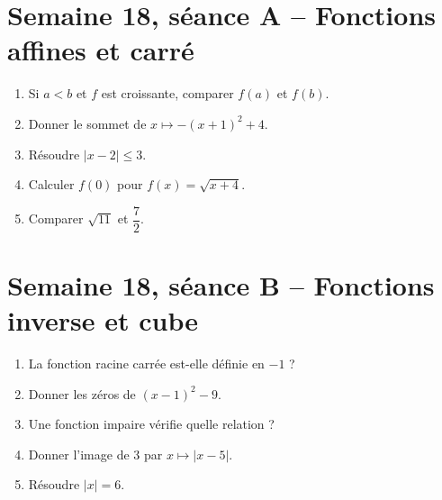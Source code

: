 \section{Semaine 18, séance A -- Fonctions affines et carré}
\begin{enumerate}
  \item Si $a<b$ et $f$ est croissante, comparer $f(a)$ et $f(b)$.
  \item Donner le sommet de $x\mapsto-(x+1)^2+4$.
  \item Résoudre $|x-2|\leq3$.
  \item Calculer $f(0)$ pour $f(x)=\sqrt{x+4}$.
  \item Comparer $\sqrt{11}$ et $\dfrac72$.
\end{enumerate}

\section{Semaine 18, séance B -- Fonctions inverse et cube}
\begin{enumerate}
  \item La fonction racine carrée est-elle définie en $-1$ ?
  \item Donner les zéros de $(x-1)^2-9$.
  \item Une fonction impaire vérifie quelle relation ?
  \item Donner l'image de $3$ par $x\mapsto|x-5|$.
  \item Résoudre $|x|=6$.
\end{enumerate}

